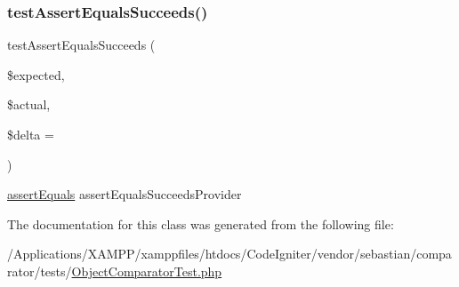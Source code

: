 \subsubsection{\texorpdfstring{test\+Assert\+Equals\+Succeeds()}{testAssertEqualsSucceeds()}}
{\footnotesize\ttfamily test\+Assert\+Equals\+Succeeds (\begin{DoxyParamCaption}\item[{}]{\$expected,  }\item[{}]{\$actual,  }\item[{}]{\$delta = {} }\end{DoxyParamCaption})}

\mbox{\hyperlink{_functions_8php_a441ec5f09711b6271edda774132eec5f}{assert\+Equals}}  assert\+Equals\+Succeeds\+Provider 

The documentation for this class was generated from the following file\+:\begin{DoxyCompactItemize}
\item 
/\+Applications/\+X\+A\+M\+P\+P/xamppfiles/htdocs/\+Code\+Igniter/vendor/sebastian/comparator/tests/\mbox{\hyperlink{_object_comparator_test_8php}{Object\+Comparator\+Test.\+php}}\end{DoxyCompactItemize}
